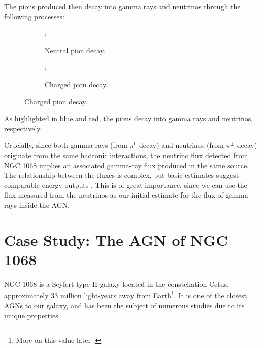 The pions produced then decay into gamma rays and neutrinos through the following processes:
\begin{figure}[H]
    \centering
    \begin{subfigure}{0.45\textwidth}
        \centering
        ;
        \caption{Neutral pion decay.}
    \end{subfigure}
    \begin{subfigure}{0.45\textwidth}
        \centering
        ;
        \caption{Charged pion decay.}
    \end{subfigure}
  \end{figure}

As highlighted in blue and red, the pions decay into gamma rays and neutrinos, respectively.

Crucially, since both gamma rays (from $\pi^0$ decay) and neutrinos (from $\pi^\pm$ decay) originate from the same hadronic interactions, the neutrino flux detected from NGC 1068 implies an associated gamma-ray flux produced in the same source. The relationship between the fluxes is complex, but basic estimates suggest comparable energy outputs  \citep{M_cke_1999}. This is of great importance, since we can use the flux measured from the neutrinos as our initial estimate for the flux of gamma rays inside the AGN.

\section{Case Study: The AGN of NGC 1068}

NGC 1068 is a Seyfert type II galaxy located in the constellation Cetus, approximately 33 million light-years away from Earth\footnote{More on this value later \citep{padovani2024highenergyneutrinosvicinitysupermassive}.}. It is one of the closest AGNs to our galaxy, and has been the subject of numerous studies due to its unique properties. \citep{2MASS}

